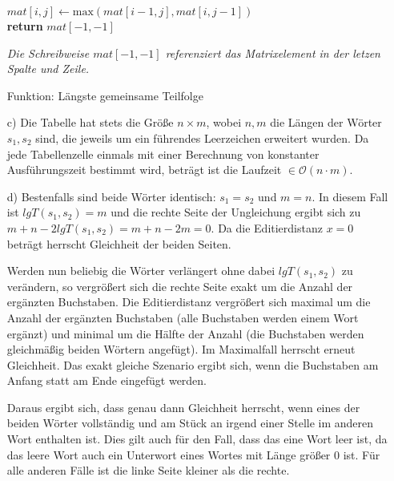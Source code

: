 \documentclass{article}
\begin{document}
\begin{enumerate}
\begin{algorithm}[h]
\begin{algorithmic}[1]
                        \Else
                            \State $mat[i, j] \gets \text{max}(mat[i-1, j], mat[i, j-1])$
                        \EndIf
                    \EndFor
                \EndFor
                \\
                \State \textbf{return} $mat[-1, -1]$
                \EndProcedure
                \end{algorithmic}
                \textit{Die Schreibweise $mat[-1, -1]$ referenziert das Matrixelement in der letzen Spalte und Zeile.}
                \caption{Funktion: Längste gemeinsame Teilfolge}
        \end{algorithm}
        \item[c)] Die Tabelle hat stets die Größe $n \times m$, wobei $n, m$ die Längen der Wörter $s_1, s_2$ sind, die jeweils um ein führendes Leerzeichen erweitert wurden. Da jede Tabellenzelle einmals mit einer Berechnung von konstanter Ausführungszeit bestimmt wird, beträgt ist die Laufzeit $\in \mathcal{O}(n\cdot m)$.
        \item[d)] Bestenfalls sind beide Wörter identisch: $s_1 = s_2$ und $m=n$. In diesem Fall ist $lgT(s_1, s_2) = m$ und die rechte Seite der Ungleichung ergibt sich zu $m+n - 2 lgT(s_1, s_2) = m+n - 2m = 0$. Da die Editierdistanz $x=0$ beträgt herrscht Gleichheit der beiden Seiten. 
        
        Werden nun beliebig die Wörter verlängert ohne dabei $lgT(s_1, s_2)$ zu verändern, so vergrößert sich die rechte Seite exakt um die Anzahl der ergänzten Buchstaben. Die Editierdistanz vergrößert sich maximal um die Anzahl der ergänzten Buchstaben (alle Buchstaben werden einem Wort ergänzt) und minimal um die Hälfte der Anzahl (die Buchstaben werden gleichmäßig beiden Wörtern angefügt). Im Maximalfall herrscht erneut Gleichheit. Das exakt gleiche Szenario ergibt sich, wenn die Buchstaben am Anfang statt am Ende eingefügt werden.

        Daraus ergibt sich, dass genau dann Gleichheit herrscht, wenn eines der beiden Wörter vollständig und am Stück an irgend einer Stelle im anderen Wort enthalten ist. Dies gilt auch für den Fall, dass das eine Wort leer ist, da das leere Wort auch ein Unterwort eines Wortes mit Länge größer 0 ist. Für alle anderen Fälle ist die linke Seite kleiner als die rechte. 
    \end{enumerate}
    
\end{document}
